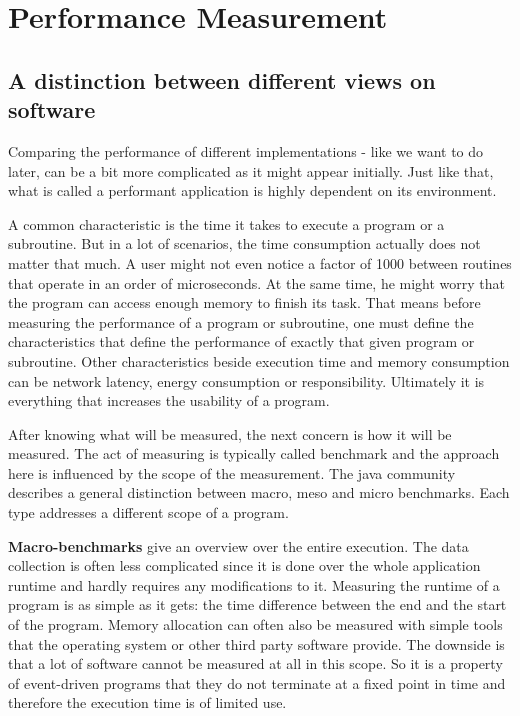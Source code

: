\section{Performance Measurement}
\label{benchmarking}
\subsection{A distinction between different views on software}
Comparing the performance of different implementations - like we want to do later, can be a bit more complicated as it might appear initially. Just like that, what is called a performant application is highly dependent on its environment. 

A common characteristic is the time it takes to execute a program or a subroutine. But in a lot of scenarios, the time consumption actually does not matter that much. A user might not even notice a factor of 1000 between routines that operate in an order of microseconds. At the same time, he might worry that the program can access enough memory to finish its task. That means before measuring the performance of a program or subroutine, one must define the characteristics that define the performance of exactly that given program or subroutine. Other characteristics beside execution time and memory consumption can be network latency, energy consumption or responsibility. Ultimately it is everything that increases the usability of a program.

After knowing what will be measured, the next concern is how it will be measured. The act of measuring is typically called benchmark and the approach here is influenced by the scope of the measurement. The java community describes a general distinction between macro, meso and micro benchmarks\cite{oaks2014java}. Each type addresses a different scope of a program.

\textbf{Macro-benchmarks} give an overview over the entire execution. The data collection is often less complicated since it is done over the whole application runtime and hardly requires any modifications to it. Measuring the runtime of a program is as simple as it gets: the time difference between the end and the start of the program. Memory allocation can often also be measured with simple tools that the operating system or other third party software provide. The downside is that a lot of software cannot be measured at all in this scope. So it is a property of event-driven programs that they do not terminate at a fixed point in time and therefore the execution time is of limited use.

